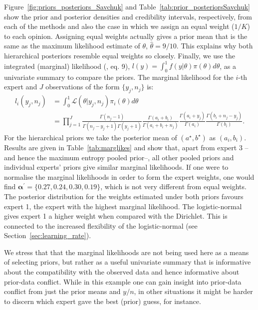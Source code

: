 \documentclass[a4paper, notitlepage, 10pt]{article}
\begin{document}
Figure~\ref{fig:priors_posteriors_Savchuk} and Table~\ref{tab:prior_posteriorsSavchuk} show the prior and posterior  densities and credibility intervals, respectively, from each of the methods and also the case in which we assign an equal weight ($1/K$) to each opinion.
Assigning equal weights actually gives a prior mean that is the same as the maximum likelihood estimate of $\theta$, $\hat{\theta} = 9/ 10$.
This explains why both hierarchical posteriors resemble equal weights so closely.
Finally, we use the integrated (marginal) likelihood (\cite{raftery2007}, eq. 9), $l(y) = \int_{0}^{1}f(y|\theta)\pi(\theta)d\theta$, as a univariate summary to compare the priors.
The marginal likelihood for the $i$-th expert and $J$ observations of the form $\{ y_j, n_j\}$ is:
\begin{align}
  \label{eq:marglike}
l_i(y_j, n_j) &= \int_{0}^{1}\mathcal{L}(\theta|y_j, n_j)\pi_i(\theta)d\theta\nonumber\\
 &= \prod_{j = 1}^{J}\frac{\Gamma(n_j-1)}{\Gamma(n_j-y_j + 1)\Gamma(y_j+1)}\frac{\Gamma(a_i + b_i)}{\Gamma(a_i + b_i + n_j)}\frac{\Gamma(a_i + y_j)}{\Gamma(a_i)}\frac{\Gamma(b_i + n_j - y_j) }{\Gamma(b_i)}.
 \end{align}
For the hierarchical priors we take the posterior mean of $(a^\star, b^\star)$ as $(a_i, b_i)$.
Results are given in Table~\ref{tab:marglikes} and show that, apart from expert $3$ -- and hence the maximum entropy pooled prior--, all other pooled priors and individual experts' priors give similar marginal likelihoods.
If one were to normalise the marginal likelihoods in order to form the expert weights, one would find $\boldsymbol\alpha^\prime = \{0.27, 0.24, 0.30, 0.19 \}$, which is not very different from equal weights.
The posterior distribution for the weights estimated under both priors favours expert 1, the expert with the highest marginal likelihood.
The logistic-normal gives expert 1 a higher weight when compared with the Dirichlet.
This is connected to the increased flexibility of the logistic-normal (see Section~\ref{sec:learning_rate}).

We stress that that the marginal likelihoods are not being used here as a means of selecting priors, but rather as a useful univariate summary that is informative about the compatibility with the observed data and hence informative about prior-data conflict.
While in this example one can gain insight into prior-data conflict from just the prior means and $y/n$, in other situations it might be harder to discern which expert gave the best (prior) guess, for instance.
\end{document}
